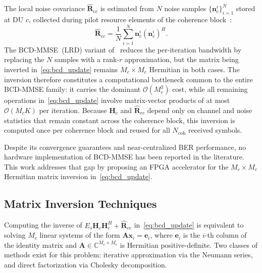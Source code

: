 \documentclass[12pt]{article}
\begin{document}
The local noise covariance $\hat{\mathbf{R}}_{cc}$ is estimated from $N$
noise samples $\{\mathbf{n}_c^i\}_{i=1}^{N}$ stored at DU $c$, collected
during pilot resource elements of the coherence block~\cite{zhao2021globecom}:
%
\begin{equation}
  \hat{\mathbf{R}}_{cc} = \frac{1}{N} \sum_{i=1}^{N}
  \mathbf{n}_c^i \left(\mathbf{n}_c^i\right)^H.
  \label{eq:Rcc_est}
\end{equation}
%
The BCD-MMSE~(LRD) variant of~\cite{zhao2025jsac} reduces the per-iteration
bandwidth by replacing the $N$ samples with a rank-$r$ approximation, but
the matrix being inverted in~\eqref{eq:bcd_update} remains $M_c \times M_c$
Hermitian in both cases. The inversion therefore constitutes a computational
bottleneck common to the entire BCD-MMSE family: it carries the dominant
$\mathcal{O}(M_c^3)$ cost, while all remaining operations in~\eqref{eq:bcd_update}
involve matrix-vector products of at most $\mathcal{O}(M_c K)$ per iteration.
Because $\mathbf{H}_c$ and $\hat{\mathbf{R}}_{cc}$ depend only on channel
and noise statistics that remain constant across the coherence block, this
inversion is computed once per coherence block and reused for all
$N_\text{coh}$ received symbols.

Despite its convergence guarantees and near-centralized BER performance,
no hardware implementation of BCD-MMSE has been reported in the literature. This work addresses that gap by
proposing an FPGA accelerator for the $M_c \times M_c$ Hermitian matrix
inversion in~\eqref{eq:bcd_update}.



\subsection{Matrix Inversion Techniques}
\label{sec:inversion}
Computing the inverse of $E_s\mathbf{H}_c\mathbf{H}_c^H +
\hat{\mathbf{R}}_{cc}$ in~\eqref{eq:bcd_update} is equivalent to solving
$M_c$ linear systems of the form $\mathbf{A}\mathbf{x}_i = \mathbf{e}_i$,
where $\mathbf{e}_i$ is the $i$-th column of the identity matrix and
$\mathbf{A} \in \mathbb{C}^{M_c \times M_c}$ is Hermitian positive-definite.
Two classes of methods exist for this problem: iterative approximation via
the Neumann series, and direct factorization via Cholesky decomposition.
\end{document}
